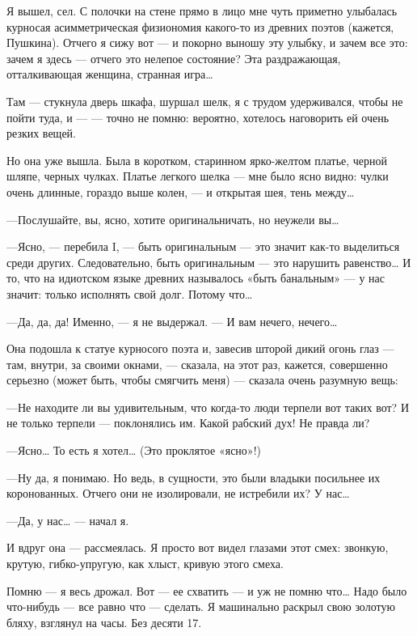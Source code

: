 \documentclass[11pt,openany]{book}
\begin{document}
Я вышел, сел. С полочки на стене прямо в лицо мне чуть приметно улыбалась курносая асимметрическая физиономия какого-то из древних поэтов (кажется, Пушкина). Отчего я сижу вот --- и покорно выношу эту улыбку, и зачем все это: зачем я здесь --- отчего это нелепое состояние? Эта раздражающая, отталкивающая женщина, странная игра\ldots{}

Там --- стукнула дверь шкафа, шуршал шелк, я с трудом удерживался, чтобы не пойти туда, и --- --- точно не помню: вероятно, хотелось наговорить ей очень резких вещей.

Но она уже вышла. Была в коротком, старинном ярко-желтом платье, черной шляпе, черных чулках. Платье легкого шелка --- мне было ясно видно: чулки очень длинные, гораздо выше колен, --- и открытая шея, тень между\ldots{}

---Послушайте, вы, ясно, хотите оригинальничать, но неужели вы\ldots{}

---Ясно, --- перебила I, --- быть оригинальным --- это значит как-то выделиться среди других. Следовательно, быть оригинальным --- это нарушить равенство\ldots{} И то, что на идиотском языке древних называлось «быть банальным» --- у нас значит: только исполнять свой долг. Потому что\ldots{}

---Да, да, да! Именно, --- я не выдержал. --- И вам нечего, нечего\ldots{}

Она подошла к статуе курносого поэта и, завесив шторой дикий огонь глаз --- там, внутри, за своими окнами, --- сказала, на этот раз, кажется, совершенно серьезно (может быть, чтобы смягчить меня) --- сказала очень разумную вещь:

---Не находите ли вы удивительным, что когда-то люди терпели вот таких вот? И не только терпели --- поклонялись им. Какой рабский дух! Не правда ли?

---Ясно\ldots{} То есть я хотел\ldots{} (Это проклятое «ясно»!)

---Ну да, я понимаю. Но ведь, в сущности, это были владыки посильнее их коронованных. Отчего они не изолировали, не истребили их? У нас\ldots{}

---Да, у нас\ldots{} --- начал я.

И вдруг она --- рассмеялась. Я просто вот видел глазами этот смех: звонкую, крутую, гибко-упругую, как хлыст, кривую этого смеха.

Помню --- я весь дрожал. Вот --- ее схватить --- и уж не помню что\ldots{} Надо было что-нибудь --- все равно что --- сделать. Я машинально раскрыл свою золотую бляху, взглянул на часы. Без десяти 17.
\end{document}
